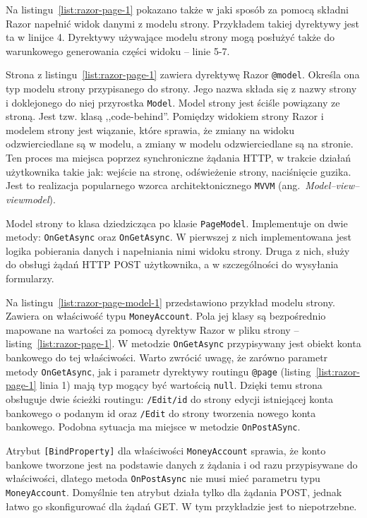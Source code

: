 Na listingu~\ref{list:razor-page-1} pokazano także w jaki sposób za pomocą składni Razor napełnić widok danymi z modelu strony. Przykładem takiej dyrektywy jest ta w linijce 4. Dyrektywy używające modelu strony mogą posłużyć także do warunkowego generowania części widoku -- linie 5-7.

Strona z listingu~\ref{list:razor-page-1} zawiera dyrektywę Razor \texttt{@model}. Określa ona typ modelu strony przypisanego do strony. Jego nazwa składa się z nazwy strony i doklejonego do niej przyrostka \texttt{Model}. Model strony jest ściśle powiązany ze stroną. Jest tzw. klasą ,,code-behind''. Pomiędzy widokiem strony Razor i modelem strony jest wiązanie, które sprawia, że zmiany na widoku odzwierciedlane są w modelu, a zmiany w modelu odzwierciedlane są na stronie. Ten proces ma miejsca poprzez synchroniczne żądania HTTP, w trakcie działań użytkownika takie jak: wejście na stronę, odświeżenie strony, naciśnięcie guzika. Jest to realizacja popularnego wzorca architektonicznego \texttt{MVVM} (ang.~\emph{Model–view–viewmodel}).

Model strony to klasa dziedzicząca po klasie \texttt{PageModel}. Implementuje on dwie metody: \texttt{OnGetAsync} oraz \texttt{OnGetAsync}. W pierwszej z nich implementowana jest logika pobierania danych i napełniania nimi widoku strony. Druga z nich, służy do obsługi żądań HTTP POST użytkownika, a w szczególności do wysyłania formularzy. 

Na listingu~\ref{list:razor-page-model-1} przedstawiono przykład modelu strony. Zawiera on właściwość typu \texttt{MoneyAccount}. Pola jej klasy są bezpośrednio mapowane na wartości za pomocą dyrektyw Razor w pliku strony -- listing~\ref{list:razor-page-1}. W metodzie \texttt{OnGetAsync} przypisywany jest obiekt konta bankowego do tej właściwości. Warto zwrócić uwagę, że zarówno parametr metody \texttt{OnGetAsync}, jak i parametr dyrektywy routingu \texttt{@page} (listing~\ref{list:razor-page-1} linia 1) mają typ mogący być wartością \texttt{null}. Dzięki temu strona obsługuje dwie ścieżki routingu: \texttt{/Edit/{id}} do strony edycji istniejącej konta bankowego o podanym id oraz \texttt{/Edit} do strony tworzenia nowego konta bankowego. Podobna sytuacja ma miejsce w metodzie \texttt{OnPostASync}.

Atrybut \texttt{[BindProperty]} dla właściwości \texttt{MoneyAccount} sprawia, że konto bankowe tworzone jest na podstawie danych z żądania i od razu przypisywane do właściwości, dlatego metoda \texttt{OnPostAsync} nie musi mieć parametru typu \texttt{MoneyAccount}. Domyślnie ten atrybut działa tylko dla żądania POST, jednak łatwo go skonfigurować dla żądań GET. W tym przykładzie jest to niepotrzebne.

